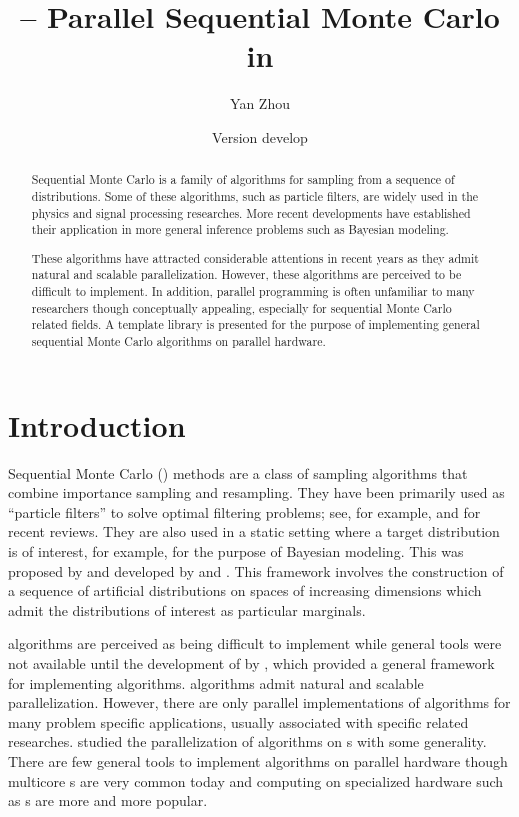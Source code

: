 \documentclass[11pt,bib,mint,hyper,altcolor]{marticle}
\def\version{develop}
\begin{document}
\title{\protect\vsmc{} -- Parallel Sequential Monte Carlo in \protect\cpp}
\author{Yan Zhou}
\date{Version \version}

\maketitle
\tableofcontents

\begin{abstract}
  Sequential Monte Carlo is a family of algorithms for sampling from a sequence
  of distributions. Some of these algorithms, such as particle filters, are
  widely used in the physics and signal processing researches. More recent
  developments have established their application in more general inference
  problems such as Bayesian modeling.

  These algorithms have attracted considerable attentions in recent years as
  they admit natural and scalable parallelization. However, these algorithms
  are perceived to be difficult to implement. In addition, parallel programming
  is often unfamiliar to many researchers though conceptually appealing,
  especially for sequential Monte Carlo related fields. A \cpp template library
  is presented for the purpose of implementing general sequential Monte Carlo
  algorithms on parallel hardware.
\end{abstract}

\section{Introduction}
\label{sec:Introduction}

Sequential Monte Carlo (\smc) methods are a class of sampling algorithms that
combine importance sampling and resampling. They have been primarily used as
``particle filters'' to solve optimal filtering problems; see, for example,
\textcite{Cappe:2007hz} and \textcite{Doucet:2011us} for recent reviews. They
are also used in a static setting where a target distribution is of interest,
for example, for the purpose of Bayesian modeling. This was proposed by
\textcite{DelMoral:2006hc} and developed by \textcite{Peters:2005wh} and
\textcite{DelMoral:2006wv}. This framework involves the construction of a
sequence of artificial distributions on spaces of increasing dimensions which
admit the distributions of interest as particular marginals.

\smc algorithms are perceived as being difficult to implement while general
tools were not available until the development of \smctc by
\textcite{Johansen:2009wd}, which provided a general framework for implementing
\smc algorithms. \smc algorithms admit natural and scalable parallelization.
However, there are only parallel implementations of \smc algorithms for many
problem specific applications, usually associated with specific \smc related
researches. \textcite{Lee:2010fm} studied the parallelization of \smc
algorithms on \gpu{}s with some generality. There are few general tools to
implement \smc algorithms on parallel hardware though multicore \cpu{}s are
very common today and computing on specialized hardware such as \gpu{}s are
more and more popular.
\end{document}
